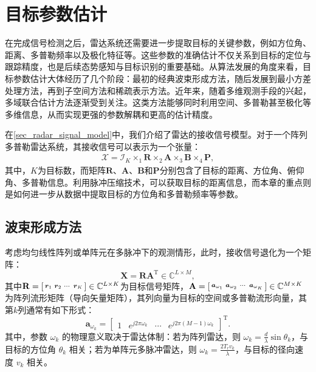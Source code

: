\chapter{目标参数估计}

在完成信号检测之后，雷达系统还需要进一步提取目标的关键参数，例如方位角、距离、多普勒频率以及极化特征等。这些参数的准确估计不仅关系到目标的定位与跟踪精度，也是后续态势感知与目标识别的重要基础。从算法发展的角度来看，目标参数估计大体经历了几个阶段：最初的经典波束形成方法，随后发展到最小方差处理方法，再到子空间方法和稀疏表示方法。近年来，随着多维观测手段的兴起，多域联合估计方法逐渐受到关注。这类方法能够同时利用空间、多普勒甚至极化等多维信息，从而实现更强的参数解耦和更高的估计精度。

在\cref{sec_radar_signal_model}中，我们介绍了雷达的接收信号模型。对于一个阵列多普勒雷达系统，其接收信号可以表示为一个张量：
\[
    \begin{split}
        \mathcal{X} = \mathcal{I}_K \times_1 \mathbf{R} \times_2 \mathbf{A} \times_3 \mathbf{B} \times_4 \mathbf{P},
    \end{split}
\]
其中，\( K \)为目标数，而矩阵\( \mathbf{R} \)、\( \mathbf{A} \)、\( \mathbf{B} \)和\( \mathbf{P} \)分别包含了目标的距离、方位角、俯仰角、多普勒信息。利用脉冲压缩技术，可以获取目标的距离信息，而本章的重点则是如何进一步从数据中提取目标的方位角和多普勒频率等参数。

\section{波束形成方法}
考虑均匀线性阵列或单阵元在多脉冲下的观测情形，此时，接收信号退化为一个矩阵：
\[
    \mathbf{X} = \mathbf{R} \mathbf{A}^{\mathrm{T}} \in \mathbb{C}^{L \times M},
\]
其中\( \mathbf{R} = \begin{bsmallmatrix} \boldsymbol{r}_1 & \boldsymbol{r}_2 & \cdots & \boldsymbol{r}_K \end{bsmallmatrix} \in \mathbb{C}^{L \times K} \)为目标信号矩阵，\( \mathbf{A} = \begin{bsmallmatrix} \boldsymbol{a}_{\omega_1} & \boldsymbol{a}_{\omega_2} & \cdots & \boldsymbol{a}_{\omega_K} \end{bsmallmatrix} \in \mathbb{C}^{M \times K} \)为阵列流形矩阵（导向矢量矩阵），其列向量为目标的空间或多普勒流形向量，其第\( k \)列通常有如下形式：
\[
    \bm{a}_{\omega_k} = \begin{bmatrix}
        1 & e^{j 2 \pi \omega_k} & \cdots & e^{j 2 \pi (M-1) \omega_k }
    \end{bmatrix}^{\mathrm{T}}.
\]
其中，参数 $\omega_k$ 的物理意义取决于雷达体制：若为阵列雷达，则 $\omega_k = \frac{d}{\lambda}\sin \theta_k$，与目标的方位角 $\theta_k$ 相关；若为单阵元多脉冲雷达，则 $\omega_k = \frac{2 T_r v_k}{\lambda}$，与目标的径向速度 $v_k$ 相关。

